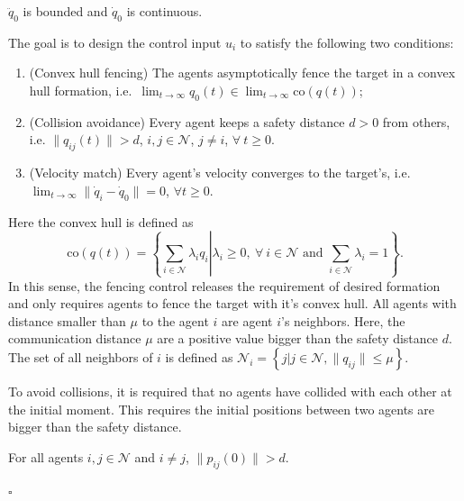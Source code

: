 \begin{assumption}
    $\ddot{q}_0$ is bounded and $\dot{q}_0$ is continuous.
    \label{assump: target}
\end{assumption}

The goal is to design the control input $u_i$ to satisfy the following two conditions:
\begin{enumerate} 
\item[\textbf{P1}] (Convex hull fencing) The agents asymptotically fence the target in a convex hull formation, i.e.\ \( \lim_{t\to\infty} q_0(t)\in\lim_{t\to\infty}\mathrm{co}(q(t)) \);
	\item[\textbf{P2}] (Collision avoidance) Every agent keeps a safety distance $d > 0$ from others, i.e. $\| q_{ij}(t) \| > d$, $i, j \in \mathcal{N}$, $j \neq i$, $\forall ~ t \ge 0$.
	\item[\textbf{P3}] (Velocity match) Every agent's velocity converges to the target's, i.e. $\lim_{t\to\infty} \|\dot{q}_i-\dot{q}_0\|=0$, $\forall t\geq 0$.
\end{enumerate}
\noindent Here the convex hull is defined as 
\begin{equation*}
    \mathrm{co}(q(t))=\left\{\left.
        \sum_{i\in\mathcal{N}}\lambda_i q_i  \right|\lambda_i\geq 0,~\forall~ i\in\mathcal{N} \textrm{ and } \sum_{i\in\mathcal{N}}\lambda_i=1
    \right\}.
\end{equation*}
In this sense, the fencing control releases the requirement of desired formation and only requires agents to fence the target with it's convex hull.
All agents with distance smaller than $\mu$ to the agent $i$ are agent $i$'s neighbors.
Here, the communication distance $\mu$ are a positive value bigger than the safety distance $d$.
The set of all neighbors of $i$ is defined as $\mathcal{N}_i=\left\{j|j\in\mathcal{N},\|q_{ij}\|\leq\mu\right\}$.

To avoid collisions, it is required that no agents have collided with each other at the initial moment.
This requires the initial positions between two agents are bigger than the safety distance.

\begin{assumption}	\label{assump initially_no_collision}
	For all agents $i,j \in \mathcal{N}$ and $i\neq j$, $\| p_{ij}(0) \| > d$.
\end{assumption}


\hfill$\square$